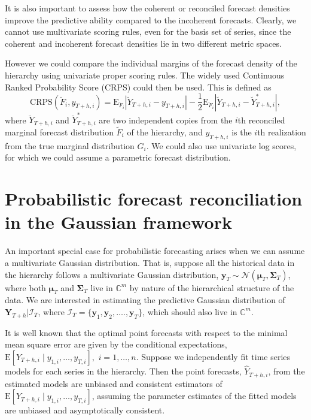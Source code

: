 \documentclass[a4paper, 11pt]{article}
\def\E{\text{E}}
\begin{document}
It is also important to assess how the coherent or reconciled forecast densities improve the predictive ability compared to the incoherent forecasts. Clearly, we cannot use multivariate scoring rules, even for the basis set of series, since the coherent and incoherent forecast densities lie in two different metric spaces.

However we could compare the individual margins of the forecast density of the hierarchy using univariate proper scoring rules. The widely used Continuous Ranked Probability Score (CRPS) could then be used. This is defined as
\begin{equation} \label{eq:(3.6)}
\text{CRPS}(\breve{F}_i,y_{T+h,i}) = \E_{\breve{F}_i}|\breve{Y}_{T+h,i}-y_{T+h,i}| - \frac{1}{2}\E_{\breve{F}_i}|\breve{Y}_{T+h,i}-\breve{Y}^*_{T+h,i}|,
\end{equation}
where $\breve{Y}_{T+h,i}$ and $\breve{Y}^*_{T+h,i}$ are two independent copies from the $i$th reconciled marginal forecast distribution $\tilde{F}_i$ of the hierarchy, and $y_{T+h,i}$ is the $i$th realization from the true marginal distribution $G_i$. We could also use univariate log scores, for which we could assume a parametric forecast distribution.

\section{Probabilistic forecast reconciliation in the Gaussian framework}\label{sec:gaussian}

An important special case for probabilistic forecasting arises when we can assume a multivariate Gaussian distribution. That is, suppose all the historical data in the hierarchy follows a multivariate Gaussian distribution, $\bm{y}_T \sim \mathcal{N}(\bm{\mu}_T, \bm{\Sigma}_T)$, where both $\bm{\mu}_T$ and $\bm{\Sigma}_T$ live in $\mathbb{C}^m$ by nature of the hierarchical structure of the data. We are interested in estimating the predictive Gaussian distribution of $\bm{Y}_{T+h}| \bm{\mathcal{I}}_T$, where $\bm{\mathcal{I}}_T= \{\bm{y}_1,\bm{y}_2,\dots.,\bm{y}_T\}$, which should also live in $\mathbb{C}^m$.

It is well known that the optimal point forecasts with respect to the minimal mean square error are given by the conditional expectations, $\E[Y_{T+h,i}\mid y_{1,i},\dots,y_{T,i}],$ $i=1,\dots,n$. Suppose we independently fit time series models for each series in the hierarchy. Then the point forecasts, $\hat{Y}_{T+h,i}$, from the estimated models are unbiased and consistent estimators of $\E[Y_{T+h,i}\mid y_{1,i},\dots,y_{T,i}]$, assuming the parameter estimates of the fitted models are unbiased and asymptotically consistent. 
\end{document}
